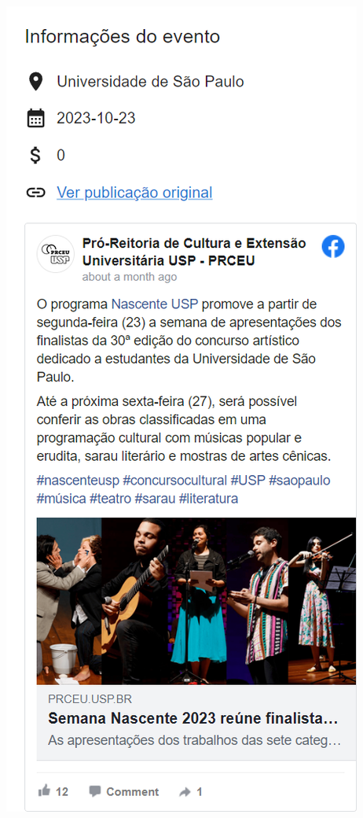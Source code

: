 \begin{multicols}{2}
    \centering
    \vspace*{\fill}
    \includegraphics[width=.7\linewidth]{figuras/detalhes_eventos.png}
    \vspace*{\fill}

    \columnbreak


\end{multicols}
